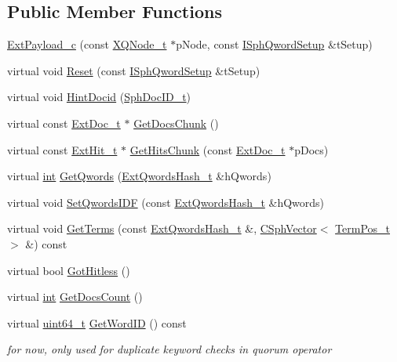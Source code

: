 \subsection*{Public Member Functions}
\begin{DoxyCompactItemize}
\item 
\hyperlink{classExtPayload__c_af459e96fc028a6d4e3e4b8f041eb1adc}{Ext\-Payload\-\_\-c} (const \hyperlink{structXQNode__t}{X\-Q\-Node\-\_\-t} $\ast$p\-Node, const \hyperlink{classISphQwordSetup}{I\-Sph\-Qword\-Setup} \&t\-Setup)
\item 
virtual void \hyperlink{classExtPayload__c_ae61da291792fc63894e5dc3dc5448a63}{Reset} (const \hyperlink{classISphQwordSetup}{I\-Sph\-Qword\-Setup} \&t\-Setup)
\item 
virtual void \hyperlink{classExtPayload__c_ad3650bc25b1874d7a0ebb41f8ede1df4}{Hint\-Docid} (\hyperlink{sphinx_8h_a3176771631c12a9e4897272003e6b447}{Sph\-Doc\-I\-D\-\_\-t})
\item 
virtual const \hyperlink{structExtDoc__t}{Ext\-Doc\-\_\-t} $\ast$ \hyperlink{classExtPayload__c_a3c9c6ebca314f519b32eefe163d4d0dc}{Get\-Docs\-Chunk} ()
\item 
virtual const \hyperlink{structExtHit__t}{Ext\-Hit\-\_\-t} $\ast$ \hyperlink{classExtPayload__c_a5ef44f413cf8163da84c36a3f2e865f2}{Get\-Hits\-Chunk} (const \hyperlink{structExtDoc__t}{Ext\-Doc\-\_\-t} $\ast$p\-Docs)
\item 
virtual \hyperlink{sphinxexpr_8cpp_a4a26e8f9cb8b736e0c4cbf4d16de985e}{int} \hyperlink{classExtPayload__c_a75d25c70431735ea8eafec98daa34151}{Get\-Qwords} (\hyperlink{sphinxsearch_8cpp_a814fc096e1ffb29d072d79b72b702fe6}{Ext\-Qwords\-Hash\-\_\-t} \&h\-Qwords)
\item 
virtual void \hyperlink{classExtPayload__c_aed53e2a280ecdae8ec5a6518d5cedb06}{Set\-Qwords\-I\-D\-F} (const \hyperlink{sphinxsearch_8cpp_a814fc096e1ffb29d072d79b72b702fe6}{Ext\-Qwords\-Hash\-\_\-t} \&h\-Qwords)
\item 
virtual void \hyperlink{classExtPayload__c_a296e05a668483c5f0a3181b7dc581991}{Get\-Terms} (const \hyperlink{sphinxsearch_8cpp_a814fc096e1ffb29d072d79b72b702fe6}{Ext\-Qwords\-Hash\-\_\-t} \&, \hyperlink{classCSphVector}{C\-Sph\-Vector}$<$ \hyperlink{structTermPos__t}{Term\-Pos\-\_\-t} $>$ \&) const 
\item 
virtual bool \hyperlink{classExtPayload__c_a2f951ea0235a9cc903bb1ef54787a23a}{Got\-Hitless} ()
\item 
virtual \hyperlink{sphinxexpr_8cpp_a4a26e8f9cb8b736e0c4cbf4d16de985e}{int} \hyperlink{classExtPayload__c_abaaeec2ce4ca33ef27df8401e421f951}{Get\-Docs\-Count} ()
\item 
virtual \hyperlink{sphinxstd_8h_aaa5d1cd013383c889537491c3cfd9aad}{uint64\-\_\-t} \hyperlink{classExtPayload__c_a2e9cfda39d799dc009c9e3674a342d19}{Get\-Word\-I\-D} () const 
\begin{DoxyCompactList}\small\item\em for now, only used for duplicate keyword checks in quorum operator \end{DoxyCompactList}\end{DoxyCompactItemize}
